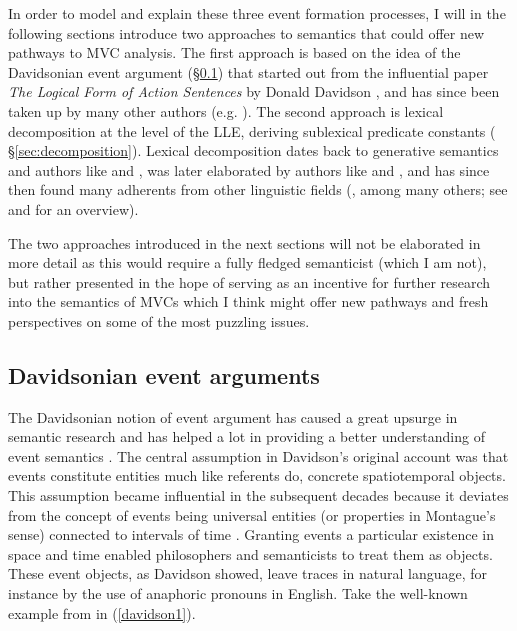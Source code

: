 In order to model and explain these three event formation processes, I will in the following sections introduce two approaches to semantics that could offer new pathways to MVC analysis. The first approach is based on the idea of the Davidsonian event argument (§\ref{sec:davidsonian}) that started out from the influential paper \textit{The Logical Form of Action Sentences} by Donald Davidson \citep{davidson1967logical}, and has since been taken up by many other authors (e.g. \citealt{higginbotham1985semantics, higginbotham2000events, kratzer1995individual, chierchia19953, maienborn2005limits, maienborn2011event}). The second approach is lexical decomposition at the level of the LLE, deriving sublexical predicate constants ( §\ref{sec:decomposition}). Lexical decomposition dates back to generative semantics and authors like \citet{lakoff1970linguistics} and \citet{mccawley1971prelexical}, was later elaborated by authors like \citet{Dowty1979} and \citet{Jackendoff1990}, and has since then found many adherents from other linguistic fields (\citealt{rappaport1998building, levin2005argument, van1997syntax}, among many others; see \citealt{engelberg2011frameworks} and \citealt{wunderlich2012lexical} for an overview).

The two approaches introduced in the next sections will not be elaborated in more detail as this would require a fully fledged semanticist (which I am not), but rather presented in the hope of serving as an incentive for further research into the semantics of MVCs which I think might offer new pathways and fresh perspectives on some of the most puzzling issues.

\subsection{Davidsonian event arguments} \label{sec:davidsonian}

The Davidsonian notion of event argument has caused a great upsurge in semantic research and has helped a lot in providing a better understanding of event semantics \citep{maienborn2005limits}. The central assumption in Davidson's original account was that events constitute entities much like referents do, concrete spatiotemporal objects. This assumption became influential in the subsequent decades because it deviates from the concept of events being universal entities (or properties in Montague's sense) connected to intervals of time \citep{pianesi2000events}. Granting events a particular existence in space and time enabled philosophers and semanticists to treat them as objects. These event objects, as Davidson showed, leave traces in natural language, for instance by the use of anaphoric pronouns in English. Take the well-known example from \citet{davidson1967logical} in (\ref{davidson1}).

